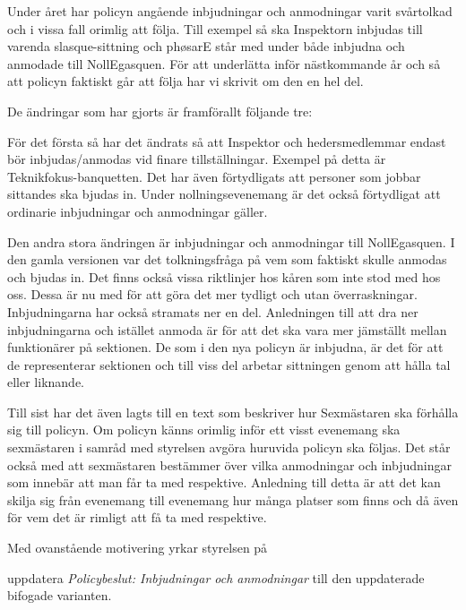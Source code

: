 \documentclass[../_main/handlingar.tex]{subfiles}
\begin{document}

Under året har policyn angående inbjudningar och anmodningar varit svårtolkad och i vissa fall orimlig att följa. Till exempel så ska Inspektorn inbjudas till varenda slasque-sittning och phøsarE står med under både inbjudna och anmodade till NollEgasquen. För att underlätta inför nästkommande år och så att policyn faktiskt går att följa har vi skrivit om den en hel del.

De ändringar som har gjorts är framförallt följande tre:

För det första så har det ändrats så att Inspektor och hedersmedlemmar endast bör inbjudas/anmodas vid finare tillställningar. Exempel på detta är Teknikfokus-banquetten. Det har även förtydligats att personer som jobbar sittandes ska bjudas in. Under nollningsevenemang är det också förtydligat att ordinarie inbjudningar och anmodningar gäller. 

Den andra stora ändringen är inbjudningar och anmodningar till NollEgasquen. I den gamla versionen var det tolkningsfråga på vem som faktiskt skulle anmodas och bjudas in. Det finns också vissa riktlinjer hos kåren som inte stod med hos oss. Dessa är nu med för att göra det mer tydligt och utan överraskningar. Inbjudningarna har också stramats ner en del. Anledningen till att dra ner inbjudningarna och istället anmoda är för att det ska vara mer jämställt mellan funktionärer på sektionen. De som i den nya policyn är inbjudna, är det för att de representerar sektionen och till viss del arbetar sittningen genom att hålla tal eller liknande.

Till sist har det även lagts till en text som beskriver hur Sexmästaren ska förhålla sig till policyn. Om policyn känns orimlig inför ett visst evenemang ska sexmästaren i samråd med styrelsen avgöra huruvida policyn ska följas. Det står också med att sexmästaren bestämmer över vilka anmodningar och inbjudningar som innebär att man får ta med respektive. Anledning till detta är att det kan skilja sig från evenemang till evenemang hur många platser som finns och då även för vem det är rimligt att få ta med respektive. 

Med ovanstående motivering yrkar styrelsen på

\begin{attsatser}
    \att uppdatera \textit{Policybeslut: Inbjudningar och anmodningar} till den uppdaterade bifogade varianten.
\end{attsatser}
\end{document}
